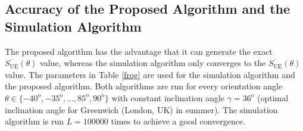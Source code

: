 \subsection{Accuracy of the Proposed Algorithm and the Simulation Algorithm \label{anna}}
The proposed algorithm has the advantage that it can generate the exact $\overline{S_{\mathrm{UE}}}(\theta)$ value, whereas the simulation algorithm only converges to the $\overline{S_{\mathrm{UE}}}(\theta)$ value.
The parameters in Table \ref{frog} are used for the simulation algorithm and the proposed algorithm. Both algorithms are run for every orientation angle $\theta \in \{-40^{\mathrm{o}},-35^{\mathrm{o}},...,85^{\mathrm{o}},90^{\mathrm{o}}\}$ with constant inclination angle $\gamma=36^{\mathrm{o}}$ (optimal inclination angle for Greenwich (London, UK) in summer). The simulation algorithm is run $L=100000$ times to achieve a good convergence. 





